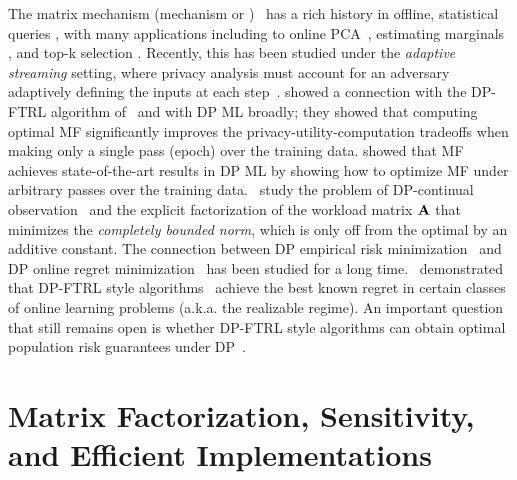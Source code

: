 \documentclass{article}
\begin{document}
The matrix mechanism (\MF mechanism or \MF)~\citep{Li2015TheMM} has a rich history in offline, statistical queries \citep{hdmm,edmonds_nikolov_ullman,yuan2016convex,HT10}, with many applications including to online PCA~\cite{dwork2014analyze}, estimating marginals \cite{edmonds_nikolov_ullman}, and top-k selection \citep{denisov22matfact}. Recently, this has been studied under the \emph{adaptive streaming} setting, where privacy analysis must account for an adversary adaptively defining the inputs at each step~\citep{fichtenberger_constant22,denisov22matfact}.
\citet{denisov22matfact} showed a connection with the DP-FTRL algorithm of~\citet{kairouz2021practical} and with DP ML broadly; they showed that computing optimal MF significantly improves the privacy-utility-computation tradeoffs when making only a single pass (epoch) over the training data. \citet{choquette2022multi} showed that MF achieves state-of-the-art results in DP ML by showing how to optimize MF under arbitrary passes over the training data.~\citet{henzinger2022constant} study the problem of DP-continual observation~\cite{CSS11-continual,Dwork-continual} and the explicit factorization of the workload matrix $\mathbf{A}$ that minimizes the \emph{completely bounded norm}, which is only off from the optimal by an additive constant. 
%
The connection between DP empirical risk minimization~\cite{chaudhuri2011differentially,kifer2012private,BST14,song2013stochastic,mcmahan2017learning, smith2017interaction, WLKCJN17, iyengar2019towards, song2020characterizing,ChourasiaYS21,bassily2019private,feldman2019private,bassily2020stability,kulkarni2021private,gopi2022private,asi2021adapting,asi2023near,asi2022private} and DP online regret minimization~\cite{JKT-online,guha2013nearly,kairouz2021practical,agarwal2017price,asi2022private,asi2023near} has been studied for a long time.~\citet{asi2023near} demonstrated that DP-FTRL style algorithms~\cite{kairouz2021practical,denisov22matfact,choquette2022multi} achieve the best known regret in certain classes of online learning problems (a.k.a. the realizable regime). An important question that still remains open is whether DP-FTRL style algorithms can obtain optimal population risk guarantees under DP~\cite{bassily2020stability}.


\newcommand{\ex}{\mathbf{d}}
\newcommand{\exg}{\mathbf{g}}

\section{Matrix Factorization, Sensitivity, and Efficient Implementations}\label{sec:setup}
\end{document}
